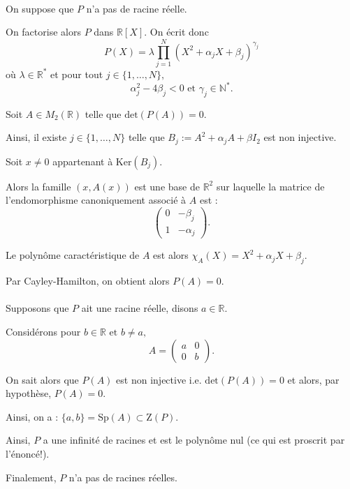 \\

On suppose que $P$ n'a pas de racine réelle.

On factorise alors $P$ dans $\mathbb{R}[X].$ On écrit donc $$P(X)=\lambda\prod_{j=1}^{N}(X^{2}+\alpha_{j}X+\beta_{j})^{\gamma_{j}}$$ où $\lambda\in \mathbb{R}^{*}$ et pour tout $j\in\{1,\ldots,N\},$ $$\alpha_{j}^{2}-4\beta_{j}<0 \mbox{ et } \gamma_{j}\in \mathbb{N}^{*}.$$

Soit $A\in M_{2}(\mathbb{R})$ telle que $\mbox{det}(P(A))=0.$

Ainsi, il existe $j\in\{1,\ldots,N\}$ telle que $B_{j}:=A^{2}+\alpha_{j}A+\beta I_{2}$ est non injective.

Soit $x\neq 0$ appartenant à $\mbox{Ker}(B_{j}).$

Alors la famille $(x,A(x))$ est une base de $\mathbb{R}^{2}$ sur laquelle la matrice de l'endomorphisme canoniquement associé à $A$ est : $$\left( \begin{array}{ll}
0 & -\beta_{j}\\
1 & -\alpha_{j}
\end{array}\right).$$

Le polynôme caractéristique de $A$ est alors $\displaystyle \chi_{A}(X)=X^{2}+\alpha_{j}X+\beta_{j}.$

Par Cayley-Hamilton, on obtient alors $\displaystyle P(A)=0.$\\

\\

Supposons que $P$ ait une racine réelle, disons $a\in\mathbb{R}.$

Considérons pour $b\in\mathbb{R} \mbox{ et } b\neq a,$ $$A=\left( \begin{array}{ll}
a & 0\\
0 & b
\end{array}\right).$$

On sait alors que $P(A)$ est non injective i.e. $\displaystyle \mbox{det}(P(A))=0$ et alors, par hypothèse, $\displaystyle P(A)=0.$

Ainsi, on a : $\displaystyle \{a,b\}=\mbox{Sp}(A)\subset \mbox{Z}(P).$

Ainsi, $P$ a une infinité de racines et est le polynôme nul (ce qui est proscrit par l'énoncé!).

Finalement, $P$ n'a pas de racines réelles.